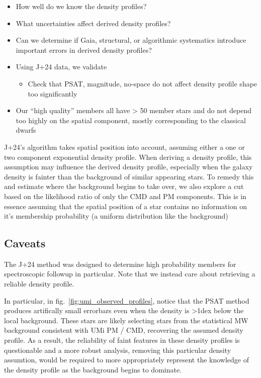 \begin{itemize}
\tightlist
\item
  How well do we know the density profiles?
\item
  What uncertainties affect derived density profiles?
\item
  Can we determine if Gaia, structural, or algorithmic systematics
  introduce important errors in derived density profiles?
\item
  Using J+24 data, we validate

  \begin{itemize}
  \tightlist
  \item
    Check that PSAT, magnitude, no-space do not affect density profile
    shape too significantly
  \end{itemize}
\item
  Our ``high quality'' members all have \textgreater{} 50 member stars
  and do not depend too highly on the spatial component, mostly
  corresponding to the classical dwarfs
\end{itemize}

J+24's algorithm takes spatial position into account, assuming either a
one or two component exponential density profile. When deriving a
density profile, this assumption may influence the derived density
profile, especially when the galaxy density is fainter than the
background of similar appearing stars. To remedy this and estimate where
the background begins to take over, we also explore a cut based on the
likelihood ratio of only the CMD and PM components. This is in essence
assuming that the spatial position of a star contains no information on
it's membership probability (a uniform distribution like the background)

\subsection{Caveats}\label{caveats}

The J+24 method was designed to determine high probability members for
spectroscopic followup in particular. Note that we instead care about
retrieving a reliable density profile.

In particular, in fig.~\ref{fig:umi_observed_profiles}, notice that the
PSAT method produces artifically small errorbars even when the density
is \textgreater1dex below the local background. These stars are likely
selecting stars from the statistical MW background consistent with UMi
PM / CMD, recovering the assumed density profile. As a result, the
reliability of faint features in these density profiles is questionable
and a more robust analysis, removing this particular density assumtion,
would be required to more appropriately represent the knowledge of the
density profile as the background begins to dominate.

